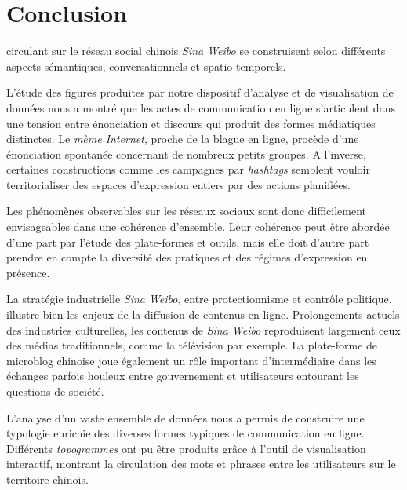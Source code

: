 \chapter*{Conclusion}


 circulant sur le réseau social chinois \textit{Sina Weibo} se construisent selon différents aspects sémantiques, conversationnels et spatio-temporels.

L'étude des figures produites par notre dispositif d'analyse et de visualisation de données nous a montré que les actes de communication en ligne s'articulent dans une tension entre énonciation et discours qui produit des formes médiatiques distinctes. Le \textit{mème Internet}, proche de la blague en ligne, procède d'une énonciation spontanée concernant de nombreux petits groupes. A l'inverse, certaines constructions comme les campagnes par \textit{hashtags} semblent vouloir territorialiser des espaces d'expression entiers par des actions planifiées.

Les phénomènes observables sur les réseaux sociaux sont donc difficilement envisageables dans une cohérence d'ensemble. Leur cohérence peut être abordée d'une part par l'étude des plate-formes et outils, mais elle doit d'autre part prendre en compte la diversité des pratiques et des régimes d'expression en présence.

La stratégie industrielle \textit{Sina Weibo}, entre protectionnisme et contrôle politique, illustre bien les enjeux de la diffusion de contenus en ligne. Prolongements actuels des industries culturelles, les contenus de \textit{Sina Weibo} reproduisent largement ceux des médias traditionnels, comme la télévision par exemple. La plate-forme de microblog chinoise joue également un rôle important d'intermédiaire dans les échanges parfois houleux entre gouvernement et utilisateurs entourant les questions de société.

L'analyse d'un vaste ensemble de données nous a permis de construire une typologie enrichie des diverses formes typiques de communication en ligne. Différents \textit{topogrammes} ont pu être produits grâce à l'outil de visualisation interactif, montrant la circulation des mots et phrases entre les utilisateurs sur le territoire chinois. 

